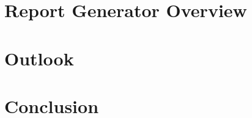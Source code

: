 \documentclass[journal]{IEEEtran}
\begin{document}




\section{Report Generator Overview}



\section{Outlook}
\label{sec:outlook}




\section{Conclusion}





\printbibliography
\end{document}
